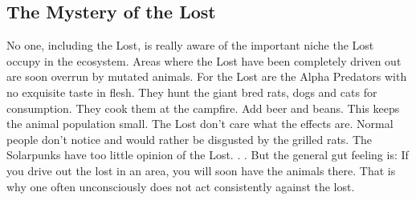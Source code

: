 \subsection{The Mystery of the Lost}
No one, including the Lost, is really aware of the important niche the Lost occupy in the ecosystem. Areas where the Lost have been completely driven out are soon overrun by mutated animals.
For the Lost are the Alpha Predators with no exquisite taste in flesh. They hunt the giant bred rats, dogs and cats for consumption. They cook them at the campfire. Add beer and beans.
This keeps the animal population small. The Lost don't care what the effects are. Normal people don't notice and would rather be disgusted by the grilled rats. The Solarpunks have too little opinion of the Lost. . .
But the general gut feeling is: If you drive out the lost in an area, you will soon have the animals there.
That is why one often unconsciously does not act consistently against the lost.